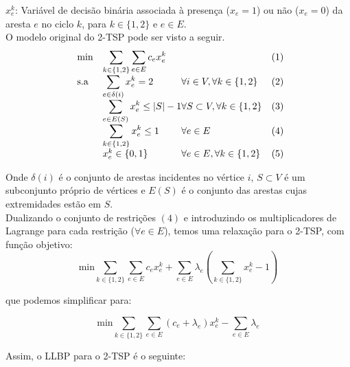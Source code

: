 \documentclass{TEMA}
\begin{document}
    $x_{e}^k$: Variável de decisão binária associada à presença ($x_e = 1$) ou não ($x_e = 0$) da aresta $e$ no ciclo $k$, para $k \in \{1,2\}$ e $e \in E$.\\
    
    O modelo original do 2-TSP pode ser visto a seguir.
    \begin{equation*}
    \begin{array}{ll@{}ll@{}ll}
    \text{min}  & \displaystyle\sum\limits_{k \in \{1,2\}}\sum\limits_{e \in E} c_{e}x_{e}^k  & &(1)\\
    \text{s.a}       & \displaystyle\sum\limits_{e \in \delta(i)} x_{e}^k = 2 & \forall i \in V,                        \forall k \in \{1,2\} &(2)\\
                     & \displaystyle\sum\limits_{e \in E(S)} x_{e}^k \leq |S|-1 & \forall S \subset V, \forall k \in \{1,2\} &(3)\\
                     & \displaystyle\sum\limits_{k \in \{1,2\}} x_{e}^k \leq 1 & \forall e \in E &(4)\\
                     & x_{e}^k \in \{0,1\} & \forall e \in E, \forall k \in \{1,2\} &(5)\\
    \end{array}
    \end{equation*}
    
    Onde $\delta(i)$ é o conjunto de arestas incidentes no vértice $i$, $S \subset V$ é um subconjunto próprio de vértices e $E(S)$ é o conjunto das arestas cujas extremidades estão em $S$.\\
    
    Dualizando o conjunto de restrições $(4)$ e introduzindo os multiplicadores de Lagrange para cada restrição ($\forall e \in E$), temos uma relaxação para o 2-TSP, com função objetivo:
    \begin{equation*}
        \text{min} \displaystyle\sum\limits_{k \in \{1,2\}}\sum\limits_{e \in E} c_{e}x_{e}^k  + \sum\limits_{e \in E} \lambda_{e} (\sum\limits_{k \in \{1,2\}} x_{e}^k - 1)
    \end{equation*}
    
    que podemos simplificar para:
    
    \begin{equation*}
        \text{min} \displaystyle\sum\limits_{k \in \{1,2\}}\sum\limits_{e \in E} (c_{e}+\lambda_e)x_{e}^k - \sum\limits_{e \in E} \lambda_e
    \end{equation*}
    
    Assim, o LLBP para o 2-TSP é o seguinte:
    
\end{document}
